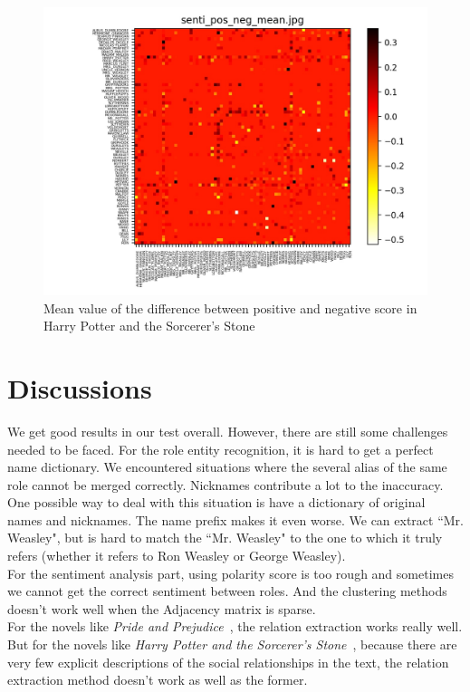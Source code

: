 \documentclass[11pt]{article}
\begin{document}
    \begin{figure}[H]
        \centering
        \includegraphics[width=\linewidth]{images/senti_pos_neg_mean.jpg}
        \caption{Mean value of the difference between positive and negative score in Harry Potter and the Sorcerer's Stone}
    \end{figure}

\section{Discussions} %
We get good results in our test overall. However, there are still some challenges needed to be faced. For the role entity recognition, it is hard to get a perfect name dictionary. We encountered situations where the several alias of the same role cannot be merged correctly. Nicknames contribute a lot to the inaccuracy. One possible way to deal with this situation is have a dictionary of original names and nicknames. The name prefix makes it even worse. We can extract ``Mr. Weasley", but is hard to match the ``Mr. Weasley" to the one to which it truly refers (whether it refers to Ron Weasley or George Weasley). \\
For the sentiment analysis part, using polarity score is too rough and sometimes we cannot get the correct sentiment between roles. And the clustering methods doesn't work well when the Adjacency matrix is sparse. \\
For the novels like \textit{Pride and Prejudice}~\cite{pride}, the relation extraction works really well. But for the novels like \textit{Harry Potter and the Sorcerer's Stone}~\cite{harrypotter}, because there are very few explicit descriptions of the social relationships in the text, the relation extraction method doesn't work as well as the former.
\end{document}
